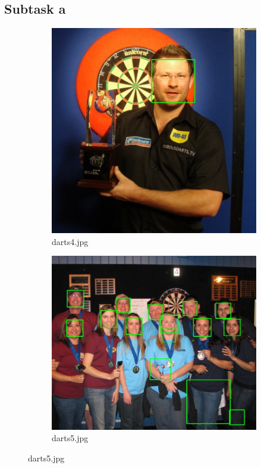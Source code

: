 \documentclass[conference]{IEEEtran}
\begin{document}
\subsection*{Subtask a}
\begin{figure}[htb]

\centering
\begin{subfigure}{.5\linewidth}
  \centering
  \includegraphics[width=.9\linewidth]{images/detected0.jpg}
  \caption{darts4.jpg}
  \label{fig:sub1}
\end{subfigure}%
\begin{subfigure}{.5\linewidth}
  \centering
  \includegraphics[width=.9\linewidth]{images/detected1.jpg}
  \caption{darts5.jpg}
  \label{fig:sub2}
\end{subfigure}


\end{figure}
\end{document}
